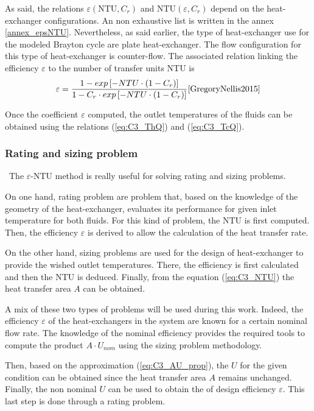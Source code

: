 As said, the relations $\varepsilon(\text{NTU},C_r)$ and $\text{NTU}(\varepsilon,C_r)$ depend on the heat-exchanger configurations. An non exhaustive list is written in the annex \ref{annex_epsNTU}\citep{GregoryNellis2015}. Nevertheless, as said earlier, the type of heat-exchanger use for the modeled Brayton cycle are plate heat-exchanger. The flow configuration for this type of heat-exchanger is counter-flow. The associated relation linking the efficiency $\varepsilon$ to the number of transfer units  NTU is 
\begin{equation}
\varepsilon = \frac{1 - exp\left[-NTU\cdot \left(1 - C_r\right)\right]}{1 - C_r\cdot exp\left[-NTU\cdot \left(1 - C_r\right)\right]}\citep{GregoryNellis2015}
\end{equation}

Once the coefficient $\varepsilon$ computed, the outlet temperatures of the fluids can be obtained using the relations (\ref{eq:C3_ThQ}) and (\ref{eq:C3_TcQ}).

\subsubsection{Rating and sizing problem}
\quad\, The $\varepsilon$-NTU method is really useful for solving rating and sizing problems.

On one hand, rating problem are problem that, based on the knowledge of the geometry of the heat-exchanger, evaluates its performance for given inlet temperature for both fluids. For this kind of problem, the NTU is first computed. Then, the efficiency $\varepsilon$ is derived to allow the calculation of the heat transfer rate.

On the other hand, sizing problems are used for the design of heat-exchanger to provide the wished outlet temperatures. There, the efficiency is first calculated and then the NTU is deduced. Finally, from the equation (\ref{eq:C3_NTU}) the heat transfer area $A$ can be obtained\citep{Ngendakumana2018}.

A mix of these two types of problems will be used during this work. Indeed, the efficiency $\varepsilon$ of the heat-exchangers in the system are known for a certain nominal flow rate.    The knowledge of the nominal efficiency provides the required tools to compute the product $A\cdot U_{nom}$ using the sizing problem methodology. 

Then, based on the approximation (\ref{eq:C3_AU_prop}), the $U$ for the given condition can be obtained since the heat transfer area $A$ remains unchanged. Finally, the non nominal $U$ can be used to obtain the of design efficiency $\varepsilon$. This last step is done through a rating problem.